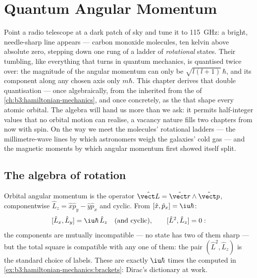 \chapter{Quantum Angular Momentum}\label{ch:b3:quantum-angular-momentum}

Point a radio telescope at a dark patch of sky and tune it to
\qty{115}{GHz}: a bright, needle-sharp line appears --- carbon
monoxide molecules, ten kelvin above absolute zero, stepping down one
rung of a ladder of \emph{rotational} states. Their tumbling, like
everything that turns in quantum mechanics, is quantised twice over:
the magnitude of the angular momentum can only be
$\sqrt{l(l+1)}\,\hbar$, and its component along any chosen axis only
$m\hbar$. This chapter derives that double quantisation --- once
algebraically, from the  inherited from the  of \cref{ch:b3:hamiltonian-mechanics}, and once concretely,
as the  that shape every atomic orbital. The
algebra will hand us more than we ask: it permits half-integer values
that no orbital motion can realise, a vacancy nature fills two
chapters from now with spin. On the way we meet the molecules'
rotational ladders --- the millimetre-wave lines by which
astronomers weigh the galaxies' cold gas --- and the magnetic moments
by which angular momentum first showed itself split.

\section{The algebra of rotation}

\begin{definition}\label{def:b3:quantum-angular-momentum:operators}
Orbital angular momentum is the operator $\hat{\vect L} =
\hat{\vect r}\wedge\hat{\vect p}$, componentwise $\hat L_z = \hat
x\hat p_y - \hat y\hat p_x$ and cyclic. From $[\hat x, \hat p_x] =
\iu\hbar$:
\[
[\hat L_x, \hat L_y] = \iu\hbar\,\hat L_z
\quad\text{(and cyclic)} , \qquad
[\hat L^2, \hat L_z] = 0 :
\]
the components are mutually incompatible --- no state has two of
them sharp --- but the total square is compatible with any one of
them: the pair $(\hat L^2, \hat L_z)$ is the standard choice of
labels. These  are exactly $\iu\hbar$ times the  computed in \cref{ex:b3:hamiltonian-mechanics:brackets}:
Dirac's dictionary at work.
\end{definition}

